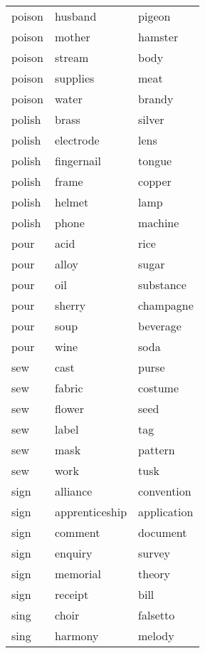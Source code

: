 \begin{longtable}{l|ll}
poison    & husband        & pigeon       \\
poison    & mother         & hamster      \\
poison    & stream         & body         \\
poison    & supplies       & meat         \\
poison    & water          & brandy       \\
polish    & brass          & silver       \\
polish    & electrode      & lens         \\
polish    & fingernail     & tongue       \\
polish    & frame          & copper       \\
polish    & helmet         & lamp         \\
polish    & phone          & machine      \\
pour      & acid           & rice         \\
pour      & alloy          & sugar        \\
pour      & oil            & substance    \\
pour      & sherry         & champagne    \\
pour      & soup           & beverage     \\
pour      & wine           & soda         \\
sew       & cast           & purse        \\
sew       & fabric         & costume      \\
sew       & flower         & seed         \\
sew       & label          & tag          \\
sew       & mask           & pattern      \\
sew       & work           & tusk         \\
sign      & alliance       & convention   \\
sign      & apprenticeship & application  \\
sign      & comment        & document     \\
sign      & enquiry        & survey       \\
sign      & memorial       & theory       \\
sign      & receipt        & bill         \\
sing      & choir          & falsetto     \\
sing      & harmony        & melody       \\

\end{longtable}
